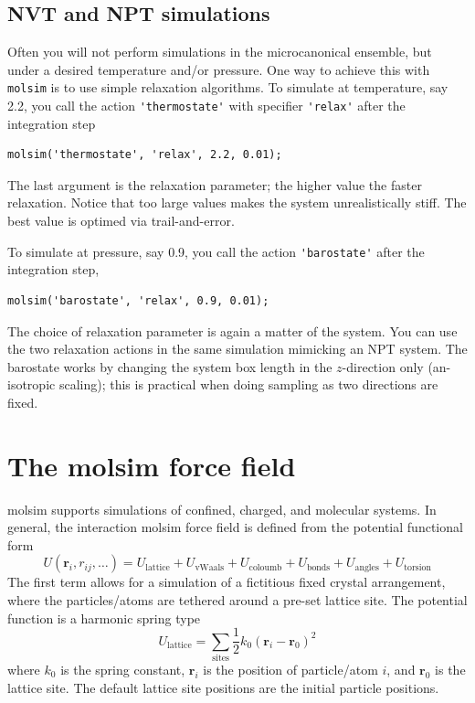 \documentclass[11pt]{article}
\begin{document}
\subsection{NVT and NPT simulations}
Often you will not perform simulations in the microcanonical ensemble, but under
a desired temperature and/or pressure. One way to achieve this with
\verb!molsim! is to use simple relaxation algorithms. To simulate at
temperature, say 2.2, you call the action \verb!'thermostate'! with specifier
\verb!'relax'! after the integration step
\begin{verbatim}
molsim('thermostate', 'relax', 2.2, 0.01);
\end{verbatim}
The last argument is the relaxation parameter; the higher value the faster
relaxation. Notice that too large values makes the system unrealistically
stiff. The best value is optimed via trail-and-error.

To simulate at pressure, say 0.9, you call the action \verb!'barostate'! after
the integration step,
\begin{verbatim}
molsim('barostate', 'relax', 0.9, 0.01);
\end{verbatim}
The choice of relaxation parameter is again a matter of the system. You can use
the two relaxation actions in the same simulation mimicking an NPT system. The
barostate works by changing the system box length in the $z$-direction only
(an-isotropic scaling); this is practical when doing sampling as two directions
are fixed.

\section{The \textsf{molsim} force field}
\textsf{molsim} supports simulations of confined, charged, and molecular
systems. In general, the interaction \textsf{molsim} force field is defined from
the potential functional form
\begin{equation}
  U(\mathbf{r}_i, r_{ij}, \ldots)
  =  U_\mathrm{lattice} + U_\mathrm{vWaals} + U_{\mathrm{coloumb}} +
  U_\mathrm{bonds} + U_\mathrm{angles} + 
  U_\mathrm{torsion}
\end{equation}
The first term allows for a simulation of a fictitious fixed crystal
arrangement, where the particles/atoms are tethered around a pre-set lattice
site. The potential function is a harmonic spring type
\begin{equation}
  U_\mathrm{lattice} =
  \sum_\mathrm{sites} \frac{1}{2}k_0 (\mathbf{r}_i - \mathbf{r}_0)^2
\end{equation}
where $k_0$ is the spring constant, $\mathbf{r}_i$ is the position of
particle/atom $i$, and $\mathbf{r}_0$ is the lattice site. The default
lattice site positions are the initial particle positions.
\end{document}
